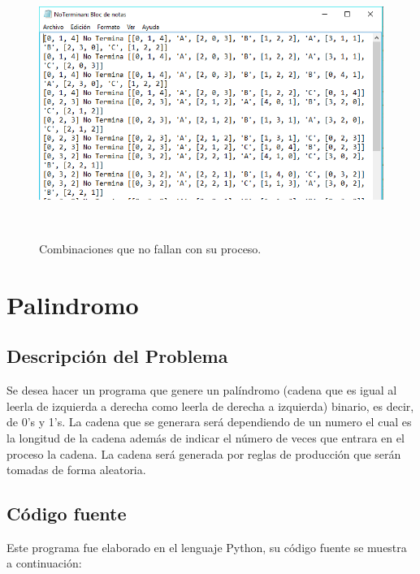 \documentclass[12pt]{article}
\begin{document}
\begin{figure}[H]
\begin{center}
\includegraphics[width=\textwidth, height=8cm]{manual_planetas_nofallan}
\label{ }
\caption{Combinaciones que no fallan con su proceso.}
\end{center}
\end{figure}

\newpage
\section{Palindromo}
\subsection{Descripción del Problema}

Se desea hacer un programa que genere un palíndromo (cadena que es igual al leerla de izquierda a derecha como leerla de derecha a izquierda)  binario, es decir, de 0’s y 1’s. La cadena que se generara será dependiendo de un numero el cual es la longitud de la cadena además de indicar el número de veces que entrara en el proceso la cadena. La cadena será generada por reglas de producción que serán tomadas de forma aleatoria.

\subsection{Código fuente}
Este programa fue elaborado en el lenguaje Python, su código fuente se muestra a continuación:
\end{document}
